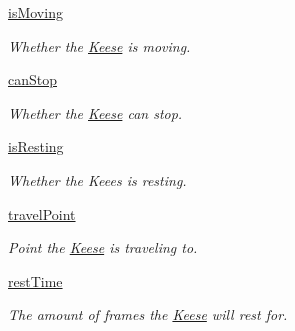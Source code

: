 \begin{DoxyCompactItemize}
\item 
\mbox{\label{classactor_1_1keese_1_1_keese_a65676a0ae6de92c1731dfa30ce354372}} 
\hyperlink{classactor_1_1keese_1_1_keese_a65676a0ae6de92c1731dfa30ce354372}{is\+Moving}
\begin{DoxyCompactList}\small\item\em Whether the \hyperlink{classactor_1_1keese_1_1_keese}{Keese} is moving. \end{DoxyCompactList}\item 
\mbox{\label{classactor_1_1keese_1_1_keese_afd916a8c02ccf5ac8a28f87f67b67d9d}} 
\hyperlink{classactor_1_1keese_1_1_keese_afd916a8c02ccf5ac8a28f87f67b67d9d}{can\+Stop}
\begin{DoxyCompactList}\small\item\em Whether the \hyperlink{classactor_1_1keese_1_1_keese}{Keese} can stop. \end{DoxyCompactList}\item 
\mbox{\label{classactor_1_1keese_1_1_keese_a38eccba4aae77109933d668223e5948c}} 
\hyperlink{classactor_1_1keese_1_1_keese_a38eccba4aae77109933d668223e5948c}{is\+Resting}
\begin{DoxyCompactList}\small\item\em Whether the Keees is resting. \end{DoxyCompactList}\item 
\mbox{\label{classactor_1_1keese_1_1_keese_ab98be6a25c06f1e149ff22c90a6937c9}} 
\hyperlink{classactor_1_1keese_1_1_keese_ab98be6a25c06f1e149ff22c90a6937c9}{travel\+Point}
\begin{DoxyCompactList}\small\item\em Point the \hyperlink{classactor_1_1keese_1_1_keese}{Keese} is traveling to. \end{DoxyCompactList}\item 
\mbox{\label{classactor_1_1keese_1_1_keese_a547b4c212a286e288e38256351776a97}} 
\hyperlink{classactor_1_1keese_1_1_keese_a547b4c212a286e288e38256351776a97}{rest\+Time}
\begin{DoxyCompactList}\small\item\em The amount of frames the \hyperlink{classactor_1_1keese_1_1_keese}{Keese} will rest for. \end{DoxyCompactList}\item 

\end{DoxyCompactItemize}
